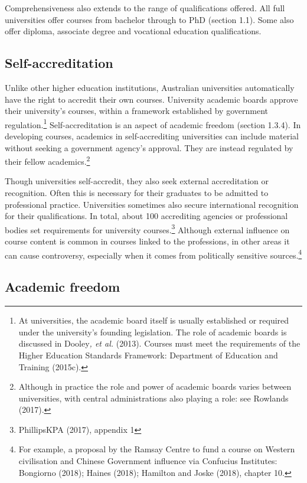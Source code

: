 \documentclass[]{book}
\begin{document}
Comprehensiveness also extends to the range of qualifications offered. All full universities offer courses from bachelor through to PhD (section 1.1). Some also offer diploma, associate degree and vocational education qualifications.

\hypertarget{self-accreditation}{%
\subsection{Self-accreditation}\label{self-accreditation}}

Unlike other higher education institutions, Australian universities automatically have the right to accredit their own courses. University academic boards approve their university's courses, within a framework established by government regulation.\footnote{At universities, the academic board itself is usually established or required under the university's founding legislation. The role of academic boards is discussed in Dooley\emph{, et al.} (2013). Courses must meet the requirements of the Higher Education Standards Framework: Department of Education and Training (2015c).} Self-accreditation is an aspect of academic freedom (section 1.3.4). In developing courses, academics in self-accrediting universities can include material without seeking a government agency's approval. They are instead regulated by their fellow academics.\footnote{Although in practice the role and power of academic boards varies between universities, with central administrations also playing a role: see Rowlands (2017).}

Though universities self-accredit, they also seek external accreditation or recognition. Often this is necessary for their graduates to be admitted to professional practice. Universities sometimes also secure international recognition for their qualifications. In total, about 100 accrediting agencies or professional bodies set requirements for university courses.\footnote{PhillipsKPA (2017), appendix 1} Although external influence on course content is common in courses linked to the professions, in other areas it can cause controversy, especially when it comes from politically sensitive sources.\footnote{For example, a proposal by the Ramsay Centre to fund a course on Western civilisation and Chinese Government influence via Confucius Institutes: Bongiorno (2018); Haines (2018); Hamilton and Joske (2018), chapter 10.}

\hypertarget{academic-freedom}{%
\subsection{Academic freedom}\label{academic-freedom}}
\end{document}
